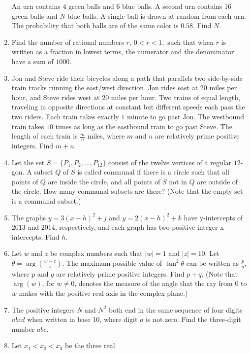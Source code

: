 \documentclass{article}
\begin{document}
\begin{enumerate}[label=\arabic*., itemsep=0.5em]
An urn contains \(4\) green balls and \(6\) blue balls. A second urn contains \(16\) green balls and \(N\) blue balls. A single ball is drawn at random from each urn. The probability that both balls are of the same color is \(0.58\). Find \(N\).\par \vspace{0.5em}\item Find the number of rational numbers \(r\), \(0<r<1,\) such that when \(r\) is written as a fraction in lowest terms, the numerator and the denominator have a sum of \(1000\).\par \vspace{0.5em}\item Jon and Steve ride their bicycles along a path that parallels two side-by-side train tracks running the east/west direction. Jon rides east at \(20\) miles per hour, and Steve rides west at \(20\) miles per hour. Two trains of equal length, traveling in opposite directions at constant but different speeds each pass the two riders. Each train takes exactly \(1\) minute to go past Jon. The westbound train takes \(10\) times as long as the eastbound train to go past Steve. The length of each train is \(\tfrac{m}{n}\) miles, where \(m\) and \(n\) are relatively prime positive integers. Find \(m+n\).\par \vspace{0.5em}\item Let the set \(S = \{P_1, P_2, \dots, P_{12}\}\) consist of the twelve vertices of a regular \(12\)-gon. A subset \(Q\) of \(S\) is called communal if there is a circle such that all points of \(Q\) are inside the circle, and all points of \(S\) not in \(Q\) are outside of the circle. How many communal subsets are there? (Note that the empty set is a communal subset.)\par \vspace{0.5em}\item The graphs \(y = 3(x-h)^2 + j\) and \(y = 2(x-h)^2 + k\) have y-intercepts of \(2013\) and \(2014\), respectively, and each graph has two positive integer x-intercepts. Find \(h\).\par \vspace{0.5em}\item Let \(w\) and \(z\) be complex numbers such that \(|w| = 1\) and \(|z| = 10\). Let \(\theta = \arg \left(\tfrac{w-z}{z}\right) \). The maximum possible value of \(\tan^2 \theta\) can be written as \(\tfrac{p}{q}\), where \(p\) and \(q\) are relatively prime positive integers. Find \(p+q\). (Note that \(\arg(w)\), for \(w \neq 0\), denotes the measure of the angle that the ray from \(0\) to \(w\) makes with the positive real axis in the complex plane.)\par \vspace{0.5em}\item The positive integers \(N\) and \(N^2\) both end in the same sequence of four digits \(abcd\) when written in base 10, where digit \(a\) is not zero. Find the three-digit number \(abc\).\par \vspace{0.5em}\item Let \(x_1< x_2 < x_3\) be the three real 
\end{enumerate}
\end{document}
